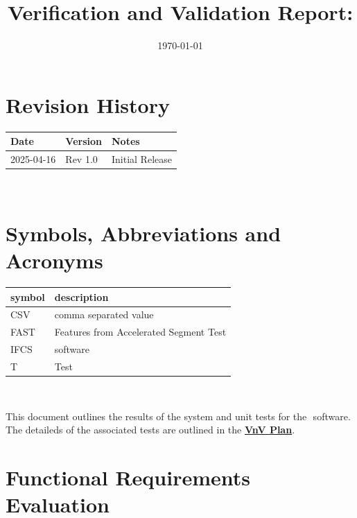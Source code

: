 \documentclass[12pt, titlepage]{article}
\begin{document}
\title{Verification and Validation Report: \progname} 
\author{\authname}
\date{\today}
	
\maketitle


\section{Revision History}

\begin{tabularx}{\textwidth}{p{3cm}p{2cm}X}
\toprule {\bf Date} & {\bf Version} & {\bf Notes}\\
\midrule
2025-04-16 & Rev 1.0 & Initial Release\\
\bottomrule
\end{tabularx}

~\newpage

\section{Symbols, Abbreviations and Acronyms}

\renewcommand{\arraystretch}{1.2}
\begin{tabular}{l l} 
  \toprule		
  \textbf{symbol} & \textbf{description}\\
  \midrule 
  CSV & comma separated value \\
  FAST & Features from Accelerated Segment Test \\
  IFCS & \progname{} software\\
  T & Test\\
  \bottomrule
\end{tabular}\\


\newpage

\tableofcontents

\listoftables %

\listoffigures %

\newpage


This document outlines the results of the system and unit tests for the \progname  $ $ software. The detaileds of the associated tests are outlined in the \href{https://github.com/KiranSingh15/CAS-741-Image-Correspondences/blob/main/docs/VnVPlan/VnVPlan.pdf}{\textbf{VnV Plan}}.
\section{Functional Requirements Evaluation}
\end{document}

